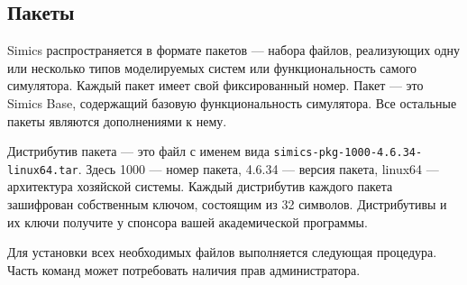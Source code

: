 \subsection{Пакеты}

Simics распространяется в формате пакетов --- набора файлов, реализующих одну или несколько типов моделируемых систем или функциональность самого симулятора. Каждый пакет имеет свой фиксированный номер. Пакет  --- это Simics Base, содержащий базовую функциональность симулятора. Все остальные пакеты являются дополнениями к нему.

Дистрибутив пакета --- это файл с именем вида \texttt{simics-pkg-1000-4.6.34-linux64.tar}.  Здесь 1000 --- номер пакета, 4.6.34 --- версия пакета, linux64 --- архитектура хозяйской системы. Каждый дистрибутив каждого пакета зашифрован собственным ключом, состоящим из 32 символов. Дистрибутивы и их ключи получите у спонсора вашей академической программы.

Для установки всех необходимых файлов выполняется следующая процедура. Часть команд может потребовать наличия прав администратора.

